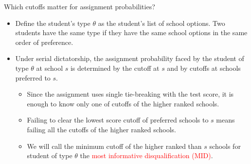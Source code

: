 \documentclass[notes,11pt, aspectratio=169]{beamer}
\begin{document}

\begin{frame}{Which cutoffs matter for assignment probabilities?}
  \begin{itemize}
  \vfill\item Define the student's type $\theta$ as the student's list of school options. Two students have the same type if they have the same school options in the same order of preference.
    \vfill\item Under serial dictatorship, the assignment probability faced by the student of type $\theta$ at school $s$ is determined by the cutoff at $s$ and by cutoffs at schools preferred to $s$.
      \begin{itemize}
    \vfill\item Since the assignment uses single tie-breaking with the test score, it is enough to know only one of cutoffs of the higher ranked schools.
    \vfill\item Failing to clear the lowest score cutoff of preferred schools to $s$ means failing all the cutoffs of the higher ranked schools.
    \vfill\item We will call the minimum cutoff of the higher ranked than $s$ schools for student of type $\theta$ the \textcolor{red}{most informative disqualification (MID)}.
     \end{itemize}
  \end{itemize}
\end{frame}
\end{document}
